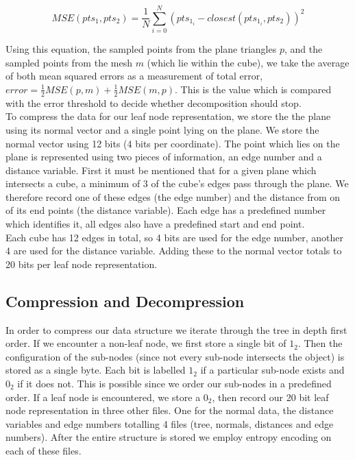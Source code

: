 \begin{equation}
 \label{eqn:MSE_1}
MSE(pts_1, pts_2) = \frac{1}{N}\sum_{i=0}^{N} (pts_{1_i} - closest(pts_{1_i}, pts_2))^2
\end{equation}

Using this equation, the sampled points from the plane triangles $p$, and the sampled points from the mesh $m$ (which lie within the cube), we take the average of both mean squared errors as a measurement of total error, $error = \frac{1}{2}MSE(p,m) + \frac{1}{2}MSE(m,p)$. This is the value which is compared with the error threshold to decide whether decomposition should stop. \\

To compress the data for our leaf node representation, we store the the plane using its normal vector and a single point lying on the plane. We store the normal vector using 12 bits (4 bits per coordinate). The point which lies on the plane is represented using two pieces of information, an edge number and a distance variable. First it must be mentioned that for a given plane which intersects a cube, a minimum of 3 of the cube's edges pass through the plane. We therefore record one of these edges (the edge number) and the distance from on of its end points (the distance variable). Each edge has a predefined number which identifies it, all edges also have a predefined start and end point. \\

Each cube has 12 edges in total, so 4 bits are used for the edge number, another 4 are used for the distance variable. Adding these to the normal vector totals to 20 bits per leaf node representation.  \\


\subsection{Compression and Decompression}

In order to compress our data structure we iterate through the tree in depth first order. If we encounter a non-leaf node, we first store a single bit of $1_2$. Then the configuration of the sub-nodes (since not every sub-node intersects the object) is stored as a single byte. Each bit is labelled $1_2$ if a particular sub-node exists and $0_2$ if it does not. This is possible since we order our sub-nodes in a predefined order. If a leaf node is encountered, we store a $0_2$, then record our 20 bit leaf node representation in three other files. One for the normal data, the distance variables and edge numbers totalling 4 files (tree, normals, distances and edge numbers). After the entire structure is stored we employ entropy encoding on each of these files. \\


